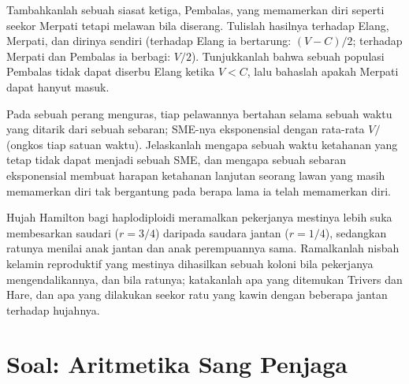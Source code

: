 \begin{exercise}[$\star\star\star$]\label{exo:b3:behavioural-ecology:10}
Tambahkanlah sebuah siasat ketiga, Pembalas, yang memamerkan diri seperti seekor Merpati tetapi
melawan bila diserang. Tulislah hasilnya terhadap Elang, Merpati, dan
dirinya sendiri (terhadap Elang ia bertarung: $(V - C)/2$; terhadap Merpati dan
Pembalas ia berbagi: $V/2$). Tunjukkanlah bahwa sebuah populasi Pembalas
tidak dapat diserbu Elang ketika $V < C$, lalu bahaslah apakah Merpati dapat
hanyut masuk.
\end{exercise}

\begin{exercise}[$\star\star\star$]\label{exo:b3:behavioural-ecology:11}
Pada sebuah perang menguras, tiap pelawannya bertahan selama sebuah waktu yang ditarik dari
sebuah sebaran; SME-nya eksponensial dengan rata-rata $V/$(ongkos tiap satuan
waktu). Jelaskanlah mengapa sebuah waktu ketahanan yang tetap tidak dapat menjadi sebuah SME, dan mengapa
sebuah sebaran eksponensial membuat harapan ketahanan lanjutan seorang
lawan yang masih memamerkan diri tak bergantung pada berapa lama ia telah
memamerkan diri.
\end{exercise}

\begin{exercise}[$\star\star\star$]\label{exo:b3:behavioural-ecology:12}
Hujah Hamilton bagi haplodiploidi meramalkan pekerjanya mestinya lebih suka
membesarkan saudari ($r = 3/4$) daripada saudara jantan ($r = 1/4$), sedangkan ratunya
menilai anak jantan dan anak perempuannya sama. Ramalkanlah nisbah kelamin
reproduktif yang mestinya dihasilkan sebuah koloni bila pekerjanya mengendalikannya, dan bila
ratunya; katakanlah apa yang ditemukan Trivers dan Hare, dan apa yang dilakukan seekor ratu yang
kawin dengan beberapa jantan terhadap hujahnya.
\end{exercise}

\section{Soal: Aritmetika Sang Penjaga}

